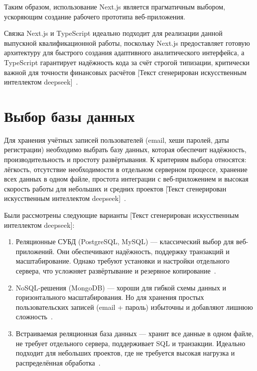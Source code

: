 Таким образом, использование Next.js является прагматичным выбором, ускоряющим создание рабочего прототипа веб-приложения.

Связка Next.js и TypeScript идеально подходит для реализации данной выпускной квалификационной работы, поскольку Next.js предоставляет готовую архитектуру для быстрого создания адаптивного аналитического интерфейса, а TypeScript гарантирует надёжность кода за счёт строгой типизации, критически важной для точности финансовых расчётов [Текст сгенерирован искусственным интеллектом deepseek]~\cite{whatIsFramework}.



\section{Выбор базы данных}

Для хранения учётных записей пользователей (email, хеши паролей, даты регистрации) необходимо выбрать базу данных, которая обеспечит надёжность, производительность и простоту развёртывания. К критериям выбора относятся: лёгкость, отсутствие необходимости в отдельном серверном процессе, хранение всех данных в одном файле, простота интеграции с веб-приложением и высокая скорость работы для небольших и средних проектов [Текст сгенерирован искусственным интеллектом deepseek]~\cite{embeddedDatabase}.

Были рассмотрены следующие варианты [Текст сгенерирован искусственным интеллектом deepseek]:

\begin{enumerate}
\item Реляционные СУБД (PostgreSQL, MySQL) — классический выбор для веб-приложений. Они обеспечивают надёжность, поддержку транзакций и масштабирование. Однако требуют установки и настройки отдельного сервера, что усложняет развёртывание и резервное копирование~\cite{embeddedDatabase}.
\item NoSQL-решения (MongoDB) — хороши для гибкой схемы данных и горизонтального масштабирования. Но для хранения простых пользовательских записей (email + пароль) избыточны и добавляют лишнюю сложность~\cite{embeddedDatabase}.
\item Встраиваемая реляционная база данных — хранит все данные в одном файле, не требует отдельного сервера, поддерживает SQL и транзакции. Идеально подходит для небольших проектов, где не требуется высокая нагрузка и распределённая обработка~\cite{bookSQLite}.
\end{enumerate}

